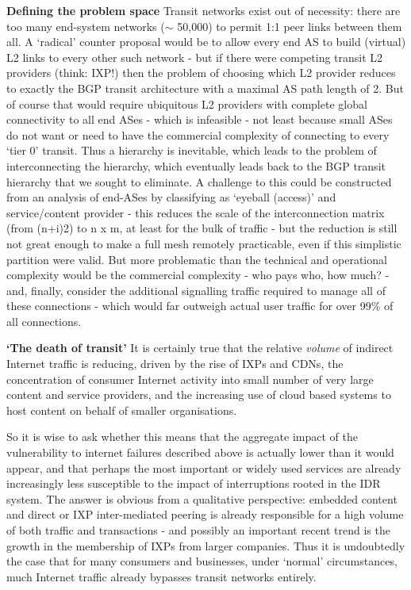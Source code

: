 \textbf{Defining the problem space} Transit networks exist out of necessity: there are too many end-system networks ($\sim$ 50,000) to permit 1:1 peer links between them all.
A ‘radical’ counter proposal would be to allow every end AS to build (virtual) L2 links to every other such network - but if there were competing transit L2 providers (think: IXP!) then the problem of choosing which L2 provider reduces to exactly the BGP transit architecture with a maximal AS path length of 2.
But of course that would require ubiquitous L2 providers with complete global connectivity to all end ASes - which is infeasible - not least because small ASes do not want or need to have the commercial complexity of connecting to every ‘tier 0’ transit. Thus a hierarchy is inevitable, which leads to the problem of interconnecting the hierarchy, which eventually leads back to the BGP transit hierarchy that we sought to eliminate.
A challenge to this could be constructed from an analysis of end-ASes by classifying as ‘eyeball (access)’ and service/content provider - this reduces the scale of the interconnection matrix (from (n+i)2) to n x m, at least for the bulk of traffic - but the reduction is still not great enough to make a full mesh remotely practicable, even if this simplistic partition were valid.
But more problematic than the technical and operational complexity would be the commercial complexity - who pays who, how much? - and, finally, consider the additional signalling traffic required to manage all of these connections - which would far outweigh actual user traffic for over 99\% of all connections.
\medskip

\textbf{‘The death of transit’} It is certainly true that the relative \emph{volume} of indirect Internet traffic is reducing, driven by the rise of IXPs and CDNs, the concentration of consumer Internet activity into small number of very large content and service providers, and the increasing use of cloud based systems to host content on behalf of smaller organisations.

So it is wise to ask whether this means that the aggregate impact of the vulnerability to internet failures described above is actually lower than it would appear, and that perhaps the most important or widely used services are already increasingly less susceptible to the impact of interruptions rooted in the IDR system.
The answer is obvious from a qualitative perspective: embedded content and direct or IXP inter-mediated peering is already responsible for a high volume of both traffic and transactions - and possibly an important recent trend is the growth in the membership of IXPs from larger companies. Thus it is undoubtedly the case that for many consumers and businesses, under `normal' circumstances, much Internet traffic already bypasses transit networks entirely. 

